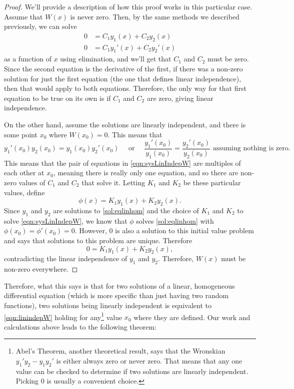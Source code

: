 \begin{proof}
We'll provide a description of how this proof works in this particular case. Assume that $W(x)$ is never zero. Then, by the same methods we described previously, we can solve
\begin{equation}
\begin{split}
0 &= C_1y_1(x) + C_2y_2(x) \\
0 &= C_1y_1'(x)  + C_2y_2'(x)
\end{split}
\label{eqn:sysLinIndepW}
\end{equation}
as a function of $x$ using elimination, and we'll get that $C_1$ and $C_2$ must be zero. Since the second equation is the derivative of the first, if there was a non-zero solution for just the first equation (the one that defines linear independence), then that would apply to both equations. Therefore, the only way for that first equation to be true on its own is if $C_1$ and $C_2$ are zero, giving linear independence. 

On the other hand, assume the solutions are linearly independent, and there is some point $x_0$ where $W(x_0) = 0$. This means that 
\begin{equation*}
y_1'(x_0)y_2(x_0) = y_1(x_0)y_2'(x_0) \quad \text{ or } \quad \frac{y_1'(x_0)}{y_1(x_0)} = \frac{y_2'(x_0)}{y_2(x_0)} \text{ assuming nothing is zero.}
\end{equation*}
This means that the pair of equations in \eqref{eqn:sysLinIndepW} are multiples of each other at $x_0$, meaning there is really only one equation, and so there are non-zero values of $C_1$ and $C_2$ that solve it. Letting $K_1$ and $K_2$ be these particular values, define
\begin{equation*}
\phi(x) = K_1y_1(x) + K_2y_2(x).
\end{equation*} 
Since $y_1$ and $y_2$ are solutions to \eqref{sol:eqlinhom} and the choice of $K_1$ and $K_2$ to solve \eqref{eqn:sysLinIndepW}, we know that $\phi$ solves \eqref{sol:eqlinhom} with $\phi(x_0) = \phi'(x_0) = 0$. However, $0$ is also a solution to this initial value problem and  says that solutions to this problem are unique. Therefore 
\begin{equation*}
0 = K_1y_1(x) + K_2y_2(x),
\end{equation*} 
contradicting the linear independence of $y_1$ and $y_2$. Therefore, $W(x)$ must be non-zero everywhere.
\end{proof}

Therefore, what this says is that for two solutions of a linear, homogeneous differential equation (which is more specific than just having two random functions), two solutions being linearly independent is equivalent to \eqref{eqn:linindepW} holding for any\footnote{%
Abel's Theorem, another theoretical result, says that the Wronskian $y_1'y_2 - y_1y_2'$ is either always zero or never zero. That means that any one value can be checked to determine if two solutions are linearly independent. Picking $0$ is usually a convenient choice.} value $x_0$ where they are defined. Our work and calculations above leads to the following theorem: 

